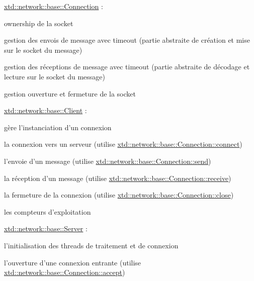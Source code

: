 \begin{DoxyItemize}
\item \hyperlink{classxtd_1_1network_1_1base_1_1Connection}{xtd\-::network\-::base\-::\-Connection} \-:
\begin{DoxyItemize}
\item ownership de la socket
\item gestion des envois de message avec timeout (partie abstraite de création et mise sur le socket du message)
\item gestion des réceptions de message avec timeout (partie abstraite de décodage et lecture sur le socket du message)
\item gestion ouverture et fermeture de la socket
\end{DoxyItemize}
\item \hyperlink{classxtd_1_1network_1_1base_1_1Client}{xtd\-::network\-::base\-::\-Client} \-:
\begin{DoxyItemize}
\item gère l'instanciation d'un connexion
\item la connexion vers un serveur (utilise \hyperlink{classxtd_1_1network_1_1base_1_1Connection_a408b83f0e43d18e32f31d6c13d6dcdf3}{xtd\-::network\-::base\-::\-Connection\-::connect})
\item l'envoie d'un message (utilise \hyperlink{classxtd_1_1network_1_1base_1_1Connection_a8ebc5958cf7d27a902bd75a55c4648bf}{xtd\-::network\-::base\-::\-Connection\-::send})
\item la réception d'un message (utilise \hyperlink{classxtd_1_1network_1_1base_1_1Connection_a09146c9c2dbf1ad85867fd0afab15c0c}{xtd\-::network\-::base\-::\-Connection\-::receive})
\item la fermeture de la connexion (utilise \hyperlink{classxtd_1_1network_1_1base_1_1Connection_a73097d339a3716c05fee7ee19753ee4a}{xtd\-::network\-::base\-::\-Connection\-::close})
\item les compteurs d'exploitation
\end{DoxyItemize}
\item \hyperlink{classxtd_1_1network_1_1base_1_1Server}{xtd\-::network\-::base\-::\-Server} \-:
\begin{DoxyItemize}
\item l'initialisation des threads de traitement et de connexion
\item l'ouverture d'une connexion entrante (utilise \hyperlink{classxtd_1_1network_1_1base_1_1Connection_af8da803db4caa1f125548508cf3db134}{xtd\-::network\-::base\-::\-Connection\-::accept})

\end{DoxyItemize}
\end{DoxyItemize}
